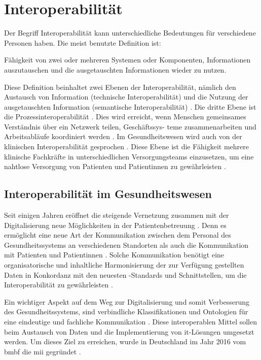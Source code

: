 \section{Interoperabilität} \label{sec:interop}

Der Begriff Interoperabilität kann unterschiedliche Bedeutungen für verschiedene Personen haben. Die meist benutzte Definition ist:

\glqq Fähigkeit von zwei oder mehreren Systemen oder Komponenten, Informationen auszutauschen und die ausgetauschten Informationen wieder zu nutzen.\grqq{} \cite{interopdef}

Diese Definition beinhaltet zwei Ebenen der Interoperabilität, nämlich den Austausch von Information (technische Interoperabilität) und die Nutzung der ausgetauschten Information (semantische Interoperabilität) \cite{telemedizin}. Die dritte Ebene ist die Prozessinteroperabilität \cite{ehealtOk}. Dies wird erreicht, wenn Menschen gemeinsames Verständnis über ein Netzwerk teilen, Geschäftssys- teme zusammenarbeiten und Arbeitsabläufe koordiniert werden \cite{interop}. Im Gesundheitswesen wird auch von der klinischen Interoperabilität gesprochen \cite{ehealtOk}. Diese Ebene ist die Fähigkeit mehrere klinische Fachkräfte in unterschiedlichen Versorgungsteams einzusetzen, um eine nahtlose Versorgung von Patienten und Patientinnen zu gewährleisten \cite{interop}.

\subsection{Interoperabilität im Gesundheitswesen} \label{subsec:interopgesund}

Seit einigen Jahren eröffnet die steigende Vernetzung zusammen mit der Digitalisierung neue Möglichkeiten in der Patientenbetreuung \cite{telemedizin}. Denn es ermöglicht eine neue Art der Kommunikation zwischen dem Personal des Gesundheitssystems an verschiedenen Standorten als auch die Kommunikation mit Patienten und Patientinnen \cite{ehealtOk}. Solche Kommunikation benötigt eine organisatorische und inhaltliche Harmonisierung der zur Verfügung gestellten Daten in Konkordanz mit den neuesten -Standards und Schnittstellen, um die Interoperabilität zu gewährleisten \cite{telemedizin}. 

Ein wichtiger Aspekt auf dem Weg zur Digitalisierung und somit Verbesserung des Gesundheitssystems, sind verbindliche Klassifikationen und Ontologien für eine eindeutige und fachliche Kommunikation \cite{ehealtOk}.  Diese interoperablen Mittel sollen beim Austausch von Daten und die Implementierung von \ac{it}-Lösungen umgesetzt werden. Um dieses Ziel zu erreichen, wurde in Deutschland im Jahr 2016 vom \ac{bmbf} die \ac{mii} gegründet \cite{telemedizin}. 

